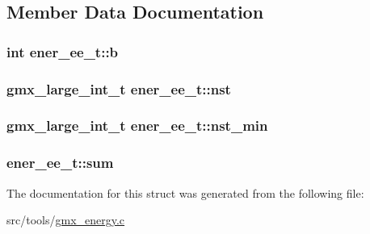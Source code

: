 \subsection{\-Member \-Data \-Documentation}
\hypertarget{structener__ee__t_ae9e7b945b23b4dc71325731471233cad}{
\subsubsection[{b}]{\setlength{\rightskip}{0pt plus 5cm}int {\bf ener\-\_\-ee\-\_\-t\-::b}}}\label{structener__ee__t_ae9e7b945b23b4dc71325731471233cad}
\hypertarget{structener__ee__t_a5cd18cdc3acf834a4513097dc7b7b060}{
\subsubsection[{nst}]{\setlength{\rightskip}{0pt plus 5cm}gmx\-\_\-large\-\_\-int\-\_\-t {\bf ener\-\_\-ee\-\_\-t\-::nst}}}\label{structener__ee__t_a5cd18cdc3acf834a4513097dc7b7b060}
\hypertarget{structener__ee__t_ac0174d3750699becaaf8d8747cb88570}{
\subsubsection[{nst\-\_\-min}]{\setlength{\rightskip}{0pt plus 5cm}gmx\-\_\-large\-\_\-int\-\_\-t {\bf ener\-\_\-ee\-\_\-t\-::nst\-\_\-min}}}\label{structener__ee__t_ac0174d3750699becaaf8d8747cb88570}
\hypertarget{structener__ee__t_a88b8415a4fcbd5a725eb10ca1cb98d17}{
\subsubsection[{sum}]{ {\bf ener\-\_\-ee\-\_\-t\-::sum}}}\label{structener__ee__t_a88b8415a4fcbd5a725eb10ca1cb98d17}


\-The documentation for this struct was generated from the following file\-:\begin{DoxyCompactItemize}
\item 
src/tools/\hyperlink{gmx__energy_8c}{gmx\-\_\-energy.\-c}\end{DoxyCompactItemize}
